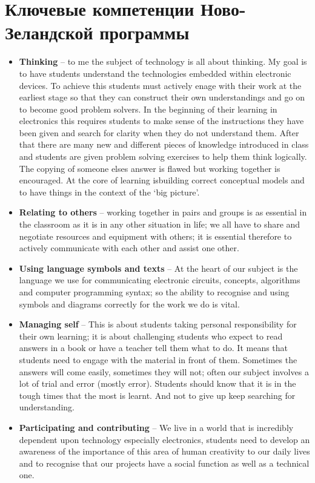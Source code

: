 \section{Ключевые компетенции Ново-Зеландской программы}

\begin{itemize}

\item\textbf{Thinking} – to me the subject of technology is all about thinking.
My goal is to have students understand the technologies embedded within electronic devices. To achieve this students
must actively enage with their work at the earliest stage so that they can construct their own
understandings and go on to become good problem solvers. In the beginning of their learning
in electronics this requires students to make sense of the instructions they have been given
and search for clarity when they do not understand them. After that there are many new and
different pieces of knowledge introduced in class and students are given problem solving
exercises to help them think logically. The copying of someone elses answer is flawed but
working together is encouraged. At the core of learning isbuilding correct conceptual models
and to have things in the context of the ‘big picture’.

\item\textbf{Relating to others} – working together in pairs and groups is as
essential in the classroom as it is in any other situation in life; we all have to share and negotiate resources and equipment
with others; it is essential therefore to actively communicate with each other and assist one
other.

\item\textbf{Using language symbols and texts} – At the heart of our subject is
the language we use for communicating electronic circuits, concepts, algorithms and computer programming syntax; so
the ability to recognise and using symbols and diagrams correctly for the work we do is vital.

\item\textbf{Managing self} – This is about students taking personal
responsibility for their own learning; it is about challenging students who expect to read answers in a book or have a teacher tell them
what to do. It means that students need to engage with the material in front of them.
Sometimes the answers will come easily, sometimes they will not; often our subject involves a
lot of trial and error (mostly error). Students should know that it is in the tough times that the
most is learnt. And not to give up keep searching for understanding.

\item\textbf{Participating and contributing} – We live in a world that is
incredibly dependent upon technology especially electronics, students need to develop an awareness of the importance
of this area of human creativity to our daily lives and to recognise that our projects have a
social function as well as a technical one.

\end{itemize}
